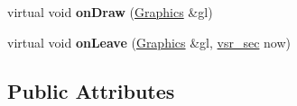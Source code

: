 \begin{DoxyCompactItemize}
\item 
\hypertarget{classvsr_1_1_mesh_node_ac37309016dbf937f13c2b1a99325749c}{virtual void {\bfseries on\-Draw} (\hyperlink{classvsr_1_1_graphics}{Graphics} \&gl)}\label{classvsr_1_1_mesh_node_ac37309016dbf937f13c2b1a99325749c}

\item 
\hypertarget{classvsr_1_1_mesh_node_a43b3ac29719b49db191343bb0e3e6b2e}{virtual void {\bfseries on\-Leave} (\hyperlink{classvsr_1_1_graphics}{Graphics} \&gl, \hyperlink{classvsr_1_1vsr__sec}{vsr\-\_\-sec} now)}\label{classvsr_1_1_mesh_node_a43b3ac29719b49db191343bb0e3e6b2e}

\end{DoxyCompactItemize}
\subsection*{Public Attributes}
